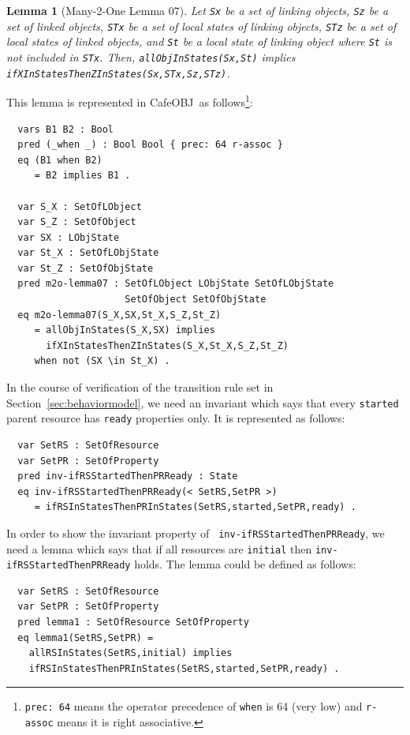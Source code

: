 \documentclass[12pt]{report}
\newtheorem{lemma}{Lemma}
\newcommand{\stt}[1]{{\small{\tt {#1}}}}
\newcommand{\cafeobj}{{\sf CafeOBJ}~}
\begin{document}
\begin{lemma}[Many-2-One Lemma 07]
  Let {\tt Sx} be a set of linking objects, {\tt Sz} be a set of
  linked objects, {\tt STx} be a set of local states of linking
  objects, {\tt STz} be a set of local states of linked objects, and
  {\tt St} be a local state of linking object where {\tt St} is not
  included in {\tt STx}. Then, \stt{allObjInStates(Sx,St)} implies
  \stt{ifXInStatesThenZInStates(Sx,STx,Sz,STz)}.
\end{lemma}
This lemma is represented in \cafeobj as follows\footnote{\stt{prec:~64} 
means the operator precedence of {\tt when} is 64 (very low) and 
{\tt r-assoc} means it is right associative.}:
\small
\begin{verbatim}
  vars B1 B2 : Bool
  pred (_when _) : Bool Bool { prec: 64 r-assoc }
  eq (B1 when B2)
     = B2 implies B1 .

  var S_X : SetOfLObject
  var S_Z : SetOfObject
  var SX : LObjState
  var St_X : SetOfLObjState
  var St_Z : SetOfObjState
  pred m2o-lemma07 : SetOfLObject LObjState SetOfLObjState 
                     SetOfObject SetOfObjState
  eq m2o-lemma07(S_X,SX,St_X,S_Z,St_Z)
     = allObjInStates(S_X,SX) implies 
       ifXInStatesThenZInStates(S_X,St_X,S_Z,St_Z)
     when not (SX \in St_X) .
\end{verbatim}
\normalsize
In the course of verification of the transition rule set in
Section~\ref{sec:behaviormodel}, we need an invariant which says that
every {\tt started} parent resource has {\tt ready} properties
only. It is represented as follows:
\small
\begin{verbatim}
  var SetRS : SetOfResource
  var SetPR : SetOfProperty
  pred inv-ifRSStartedThenPRReady : State
  eq inv-ifRSStartedThenPRReady(< SetRS,SetPR >)
     = ifRSInStatesThenPRInStates(SetRS,started,SetPR,ready) .
\end{verbatim}
\normalsize
In order to show the invariant property of {\tt
  inv-ifRSStartedThenPRReady}, we need a lemma which says that if all
resources are {\tt initial} then {\tt inv-ifRSStartedThenPRReady}
holds.  The lemma could be defined as follows:
\small
\begin{verbatim}
  var SetRS : SetOfResource
  var SetPR : SetOfProperty
  pred lemma1 : SetOfResource SetOfProperty
  eq lemma1(SetRS,SetPR) =
    allRSInStates(SetRS,initial) implies
    ifRSInStatesThenPRInStates(SetRS,started,SetPR,ready) .
\end{verbatim}
\end{document}
